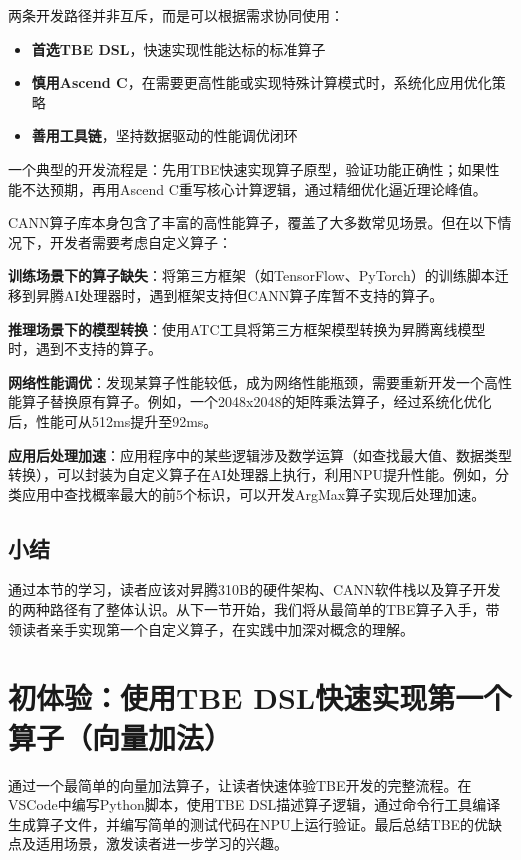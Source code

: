 两条开发路径并非互斥，而是可以根据需求协同使用：

\begin{itemize}
\tightlist
\item
  \textbf{首选TBE DSL}，快速实现性能达标的标准算子
\item
  \textbf{慎用Ascend
  C}，在需要更高性能或实现特殊计算模式时，系统化应用优化策略
\item
  \textbf{善用工具链}，坚持数据驱动的性能调优闭环
\end{itemize}

一个典型的开发流程是：先用TBE快速实现算子原型，验证功能正确性；如果性能不达预期，再用Ascend
C重写核心计算逻辑，通过精细优化逼近理论峰值。

CANN算子库本身包含了丰富的高性能算子，覆盖了大多数常见场景。但在以下情况下，开发者需要考虑自定义算子：

\textbf{训练场景下的算子缺失}：将第三方框架（如TensorFlow、PyTorch）的训练脚本迁移到昇腾AI处理器时，遇到框架支持但CANN算子库暂不支持的算子。

\textbf{推理场景下的模型转换}：使用ATC工具将第三方框架模型转换为昇腾离线模型时，遇到不支持的算子。

\textbf{网络性能调优}：发现某算子性能较低，成为网络性能瓶颈，需要重新开发一个高性能算子替换原有算子。例如，一个2048x2048的矩阵乘法算子，经过系统化优化后，性能可从512ms提升至92ms。

\textbf{应用后处理加速}：应用程序中的某些逻辑涉及数学运算（如查找最大值、数据类型转换），可以封装为自定义算子在AI处理器上执行，利用NPU提升性能。例如，分类应用中查找概率最大的前5个标识，可以开发ArgMax算子实现后处理加速。

\subsection{小结}\label{src-book-chapter7-h10}

通过本节的学习，读者应该对昇腾310B的硬件架构、CANN软件栈以及算子开发的两种路径有了整体认识。从下一节开始，我们将从最简单的TBE算子入手，带领读者亲手实现第一个自定义算子，在实践中加深对概念的理解。

\section{初体验：使用TBE
DSL快速实现第一个算子（向量加法）}\label{src-book-chapter7-h11}

通过一个最简单的向量加法算子，让读者快速体验TBE开发的完整流程。在VSCode中编写Python脚本，使用TBE
DSL描述算子逻辑，通过命令行工具编译生成算子文件，并编写简单的测试代码在NPU上运行验证。最后总结TBE的优缺点及适用场景，激发读者进一步学习的兴趣。

